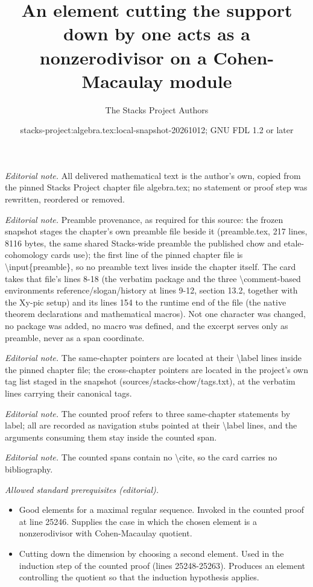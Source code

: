 \documentclass[10pt,a4paper]{amsart}
\title{An element cutting the support down by one acts as a nonzerodivisor on a Cohen-Macaulay module}
\author{The Stacks Project Authors}
\date{stacks-project:algebra.tex:local-snapshot-20261012; GNU FDL 1.2 or later}
\theoremstyle{plain}
\theoremstyle{definition}
\theoremstyle{remark}
\numberwithin{equation}{subsection}
\begin{document}
\maketitle
\noindent\textit{Editorial note.} All delivered mathematical text is the author's own, copied from the pinned Stacks Project chapter file algebra.tex; no statement or proof step was rewritten, reordered or removed.\par\medskip
\noindent\textit{Editorial note.} Preamble provenance, as required for this source: the frozen snapshot stages the chapter's own preamble file beside it (preamble.tex, 217 lines, 8116 bytes, the same shared Stacks-wide preamble the published chow and etale-cohomology cards use); the first line of the pinned chapter file is \textbackslash{}input\{preamble\}, so no preamble text lives inside the chapter itself. The card takes that file's lines 8-18 (the verbatim package and the three \textbackslash{}comment-based environments reference/slogan/history at lines 9-12, section 13.2, together with the Xy-pic setup) and its lines 154 to the runtime end of the file (the native theorem declarations and mathematical macros). Not one character was changed, no package was added, no macro was defined, and the excerpt serves only as preamble, never as a span coordinate.\par\medskip
\noindent\textit{Editorial note.} The same-chapter pointers are located at their \textbackslash{}label lines inside the pinned chapter file; the cross-chapter pointers are located in the project's own tag list staged in the snapshot (sources/stacks-chow/tags.txt), at the verbatim lines carrying their canonical tags.\par\medskip
\noindent\textit{Editorial note.} The counted proof refers to three same-chapter statements by label; all are recorded as navigation stubs pointed at their \textbackslash{}label lines, and the arguments consuming them stay inside the counted span.\par\medskip
\noindent\textit{Editorial note.} The counted spans contain no \textbackslash{}cite, so the card carries no bibliography.\par\medskip
\noindent\textit{Allowed standard prerequisites (editorial).}\begin{itemize}
\item Good elements for a maximal regular sequence. Invoked in the counted proof at line 25246. Supplies the case in which the chosen element is a nonzerodivisor with Cohen-Macaulay quotient.
\item Cutting down the dimension by choosing a second element. Used in the induction step of the counted proof (lines 25248-25263). Produces an element controlling the quotient so that the induction hypothesis applies.
\end{itemize}\medskip
\end{document}
